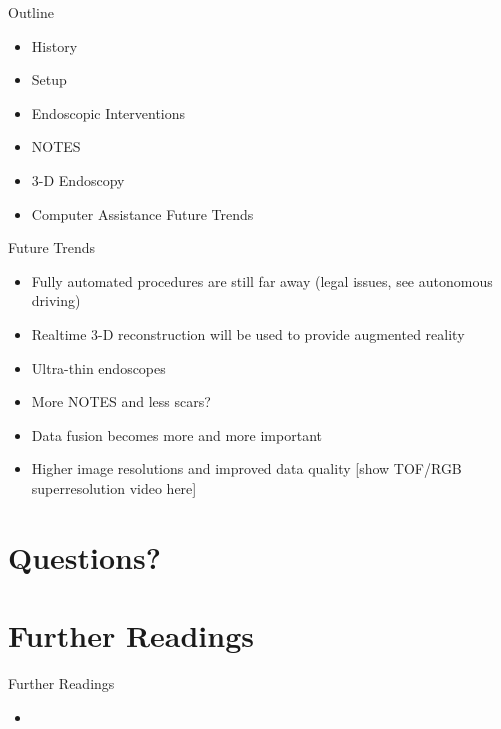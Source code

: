 \begin{frame}{Outline}
	\begin{itemize}
		\item History
		\item Setup
		\item Endoscopic Interventions
		\item NOTES
		\item 3-D Endoscopy
		\item Computer Assistance
		      \bolditem{} Future Trends
	\end{itemize}
\end{frame}



\begin{frame}{Future Trends}
	\begin{itemize}
		\item Fully automated procedures are still far away (legal issues, see autonomous driving)
		\item Realtime 3-D reconstruction will be used to provide augmented reality
		\item Ultra-thin endoscopes
		\item More NOTES and less scars?
		\item Data fusion becomes more and more important
		\item Higher image resolutions and improved data quality [show TOF/RGB
				      superresolution video here]

	\end{itemize}
\end{frame}


%
%
%

\section{Questions?}

\section{Further Readings}%
\label{sec:further_readings}


\begin{frame}[t]{Further Readings}
	\begin{itemize}
		\item {}
	\end{itemize}
\end{frame}



